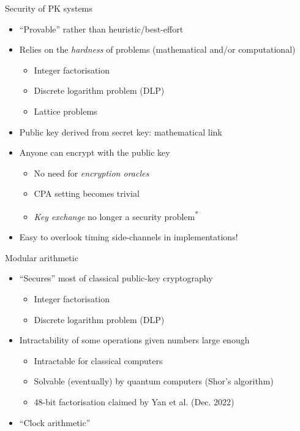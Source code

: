 \begin{frame}{Security of PK systems}
  \begin{itemize}[<+(1)->]
    \item \enquote{Provable} rather than heuristic/best-effort
    \item Relies on the \emph{hardness} of problems (mathematical and/or computational)
    \begin{itemize}
      \item Integer factorisation
      \item Discrete logarithm problem (DLP)
      \item Lattice problems
    \end{itemize}
    \item Public key derived from secret key: mathematical link
    \item Anyone can encrypt with the public key
    \begin{itemize}
      \item No need for \emph{encryption oracles}
      \item CPA setting becomes trivial
      \item \emph{Key exchange} no longer a security problem\textsuperscript{*}
    \end{itemize}
    \item Easy to overlook timing side-channels in implementations!
  \end{itemize}
\end{frame}

\begin{frame}{Modular arithmetic}
  \begin{itemize}[<+->]
    \item \enquote{Secures} most of classical public-key cryptography
    \begin{itemize}
      \item Integer factorisation
      \item Discrete logarithm problem (DLP)
    \end{itemize}
    \item Intractability of some operations given numbers large enough
    \begin{itemize}
      \item Intractable for classical computers
      \item Solvable (eventually) by quantum computers (Shor's algorithm)
      \item 48-bit factorisation claimed by Yan et al. (Dec. 2022)
    \end{itemize}
    \item \enquote{Clock arithmetic}
  \end{itemize}
\end{frame}

